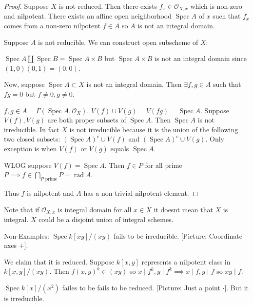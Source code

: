\documentclass{article}
\theoremstyle{definition}
\begin{document}
    \begin{proof}
        Suppose \(X\) is not reduced. Then there exists \(f_x \in \mathcal{O}_{X,x}\) which is non-zero and nilpotent. There exists an affine open neighborhood \(\operatorname{Spec} A\) of \(x\) such that \(f_x\) comes from a non-zero nilpotent \(f\in A\) so \(A\) is not an integral domain.

        Suppose \(A\) is not reducible. We can construct open subscheme of \(X\):
        
        \(\operatorname{Spec} A \coprod \operatorname{Spec} B = \operatorname{Spec} A \times B\) but \(\operatorname{Spec} A \times B\) is not an integral domain since \((1,0)(0,1) = (0,0)\).

        Now, suppose \(\operatorname{Spec} A \subset X\) is not an integral domain. Then \(\exists f,g\in A\) such that \(fg=0\) but \(f\neq 0, g\neq 0\).

        \(f,g\in A = \Gamma (\operatorname{Spec} A, \mathcal{O}_X)\). \(V(f) \cup V(g) = V(fg) = \operatorname{Spec} A\). Suppose \(V(f), V(g)\) are both proper subsets of \(\operatorname{Spec} A\). Then \(\operatorname{Spec} A\) is not irreducible. In fact \(X\) is not irreducible because it is the union of the following two closed subsets: \((\operatorname{Spec} A)^c \cup V(f)\) and \((\operatorname{Spec} A)^c \cup V(g)\). Only exception is when \(V(f)\) or \(V(g)\) equals \(\operatorname{Spec} A\).

        WLOG suppose \(V(f) = \operatorname{Spec} A\). Then \(f\in P\) for all prime \(P \implies f \in \bigcap_{P \text{ prime} } P = \operatorname{rad} A\).

        Thus \(f\) is nilpotent and \(A\) has a non-trivial nilpotent element.
    \end{proof}

    Note that if \(\mathcal{O}_{X,x}\) is integral domain for all \(x\in X\) it doesnt mean that \(X\) is integral. \(X\) could be a disjoint union of integral schemes.

    Non-Examples: \(\operatorname{Spec} k[xy] / (xy)\) fails to be irreducible. [Picture: Coordinate axes \(+\)].

    We claim that it is reduced. Suppose \(k[x,y]\) represents a nilpotent class in \(k[x,y] / (xy)\). Then \(f(x,y)^k \in (xy)\) so \(x \mid f^k, y\mid f^k \implies x\mid f, y\mid f\) so \(xy\mid f\).

    \(\operatorname{Spec} k[x] / (x^2)\) failes to be fails to be reduced. [Picture: Just a point \(\cdot\)]. But it is irreducible.
\end{document}
